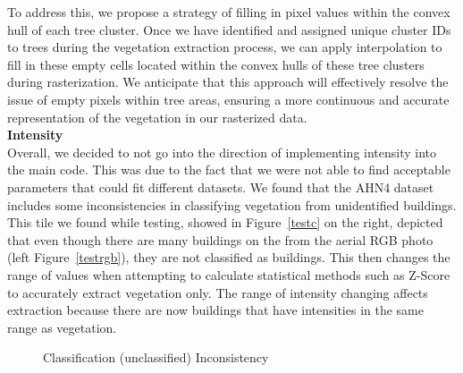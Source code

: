 \documentclass{article}
\begin{document}
\noindent To address this, we propose a strategy of filling in pixel values within the convex hull of each tree cluster. Once we have identified and assigned unique cluster IDs to trees during the vegetation extraction process, we can apply interpolation to fill in these empty cells located within the convex hulls of these tree clusters during rasterization. We anticipate that this approach will effectively resolve the issue of empty pixels within tree areas, ensuring a more continuous and accurate representation of the vegetation in our rasterized data.\\

\noindent \textbf{Intensity}\\
Overall, we decided to not go into the direction of implementing intensity into the main code. This was due to the fact that we were not able to find acceptable parameters that could fit different datasets. We found that the AHN4 dataset includes some inconsistencies in classifying vegetation from unidentified buildings. This tile we found while testing, showed in Figure~\ref{testc} on the right, depicted that even though there are many buildings on the from the aerial RGB photo (left Figure~\ref{testrgb}), they are not classified as buildings. This then changes the range of values when attempting to calculate statistical methods such as Z-Score to accurately extract vegetation only. The range of intensity changing affects extraction because there are now buildings that have intensities in the same range as vegetation. \\


\begin{figure}[H]
    \centering
    \hspace{0.5cm}
    \caption{Classification (unclassified) Inconsistency}
    \label{fig:comparison}
\end{figure}
\end{document}
